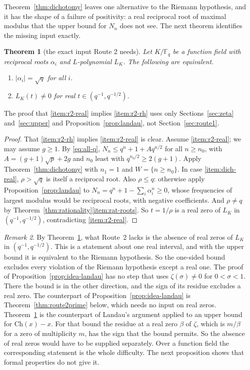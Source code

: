 \documentclass[11pt]{amsbook}
\theoremstyle{plain}
\newtheorem{theorem}{Theorem}[section]
\theoremstyle{definition}
\theoremstyle{remark}
\newtheorem{remark}[theorem]{Remark}
\numberwithin{equation}{section}
\numberwithin{figure}{chapter}
\numberwithin{table}{chapter}
\newcommand{\F}{\mathbb{F}}
\newcommand{\Ch}{\mathrm{Ch}}
\begin{document}
Theorem~\ref{thm:dichotomy} leaves one alternative to the Riemann
hypothesis, and it has the shape of a failure of positivity: a real
reciprocal root of maximal modulus that the upper bound for $N_n$
does not see. The next theorem identifies the missing input
exactly.

\begin{theorem}[the exact input Route 2 needs]
\label{thm:route2-input}
Let $K/\F_q$ be a function field with reciprocal roots $\alpha_i$
and $L$-polynomial $L_K$. The following are equivalent.
\begin{enumerate}
\item\label{item:r2-rh} $\lvert\alpha_i\rvert=\sqrt q$ for all $i$.
\item\label{item:r2-real} $L_K(t)\ne0$ for real
$t\in(q^{-1},q^{-1/2})$.
\end{enumerate}
\end{theorem}

The proof that \eqref{item:r2-real} implies \eqref{item:r2-rh} uses
only Sections~\ref{sec:zeta} and~\ref{sec:upper} and
Proposition~\ref{prop:landau}, not Section~\ref{sec:route1}.

\begin{proof}
That \eqref{item:r2-rh} implies \eqref{item:r2-real} is clear.
Assume \eqref{item:r2-real}; we may assume $g\ge1$. By
\eqref{eq:all-q}, $N_n\le q^n+1+Aq^{n/2}$ for all $n\ge n_0$, with
$A=(g+1)\sqrt p+2g$ and $n_0$ least with $q^{n_0/2}\ge2(g+1)$.
Apply Theorem~\ref{thm:dichotomy} with $n_1=1$ and
$W=\{n\ge n_0\}$. In case \eqref{item:dich-real}, $\rho>\sqrt q$ is
itself a reciprocal root. Also $\rho\le q$: otherwise apply
Proposition~\ref{prop:landau} to
$N_n=q^n+1-\sum_i\alpha_i^n\ge0$, whose frequencies of largest
modulus would be reciprocal roots, with negative coefficients. And
$\rho\ne q$ by
Theorem~\ref{thm:rationality}\eqref{item:rat-roots}. So $t=1/\rho$
is a real zero of $L_K$ in $(q^{-1},q^{-1/2})$, contradicting
\eqref{item:r2-real}.
\end{proof}

\begin{remark}\label{rem:missing-input}
By Theorem~\ref{thm:route2-input}, what Route~2 lacks is the
absence of real zeros of $L_K$ in $(q^{-1},q^{-1/2})$. This is a
statement about one real interval, and with the upper bound it is
equivalent to the Riemann hypothesis. So the one-sided bound
excludes every violation of the Riemann hypothesis except a real
one. The proof of Proposition~\ref{prop:idea-landau} has no step
that uses $\zeta(\sigma)\ne0$ for $0<\sigma<1$. There the bound is
in the other direction, and the sign of its residue excludes a real
zero. The counterpart of Proposition~\ref{prop:idea-landau} is
Theorem~\ref{thm:route2prime} below, which needs no input on real
zeros. Theorem~\ref{thm:route2-input} is the counterpart of
Landau's argument applied to an upper bound for $\Ch(x)-x$. For
that bound the residue at a real zero $\beta$ of $\zeta$, which is
$m/\beta$ for a zero of multiplicity $m$, has the sign that the
bound permits. So the absence of real zeros would have to be
supplied separately. Over a function field the corresponding
statement is the whole difficulty. The next proposition shows that
formal properties do not give it.
\end{remark}
\end{document}
